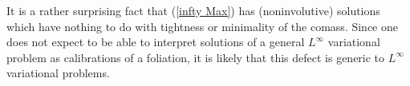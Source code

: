 \documentclass[reqno,11pt]{amsart}
\newcommand{\RR}{\mathbf{R}}
\newcommand{\Hyp}{\mathbf H}
\newcommand{\Sph}{\mathbf S}
\newcommand*\dif{\mathop{}\!\mathrm{d}}
\DeclareMathOperator{\sech}{sech}
\theoremstyle{definition}
\newtheorem{example}[theorem]{Example}
\numberwithin{equation}{section}
\newcommand\todo[1]{\textcolor{red}{TODO: #1}}
\begin{document}




It is a rather surprising fact that (\ref{infty Max}) has (noninvolutive) solutions which have nothing to do with tightness or minimality of the comass.
Since one does not expect to be able to interpret solutions of a general $L^\infty$ variational problem as calibrations of a foliation, it is likely that this defect is generic to $L^\infty$ variational problems.
\end{document}

